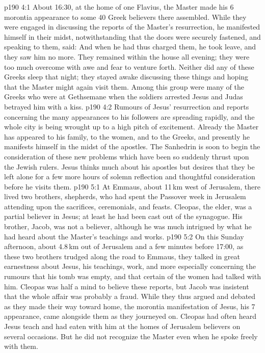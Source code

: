 \vs p190 4:1 About 16:30, at the home of one Flavius, the Master made his 6 morontia appearance to some 40 Greek believers there assembled. While they were engaged in discussing the reports of the Master’s resurrection, he manifested himself in their midst, notwithstanding that the doors were securely fastened, and speaking to them, said:  And when he had thus charged them, he took leave, and they saw him no more. They remained within the house all evening; they were too much overcome with awe and fear to venture forth. Neither did any of these Greeks sleep that night; they stayed awake discussing these things and hoping that the Master might again visit them. Among this group were many of the Greeks who were at Gethsemane when the soldiers arrested Jesus and Judas betrayed him with a kiss.
\vs p190 4:2 \pc Rumours of Jesus’ resurrection and reports concerning the many appearances to his followers are spreading rapidly, and the whole city is being wrought up to a high pitch of excitement. Already the Master has appeared to his family, to the women, and to the Greeks, and presently he manifests himself in the midst of the apostles. The Sanhedrin is soon to begin the consideration of these new problems which have been so suddenly thrust upon the Jewish rulers. Jesus thinks much about his apostles but desires that they be left alone for a few more hours of solemn reflection and thoughtful consideration before he visits them.
\vs p190 5:1 At Emmaus, about 11\,km west of Jerusalem, there lived two brothers, shepherds, who had spent the Passover week in Jerusalem attending upon the sacrifices, ceremonials, and feasts. Cleopas, the elder, was a partial believer in Jesus; at least he had been cast out of the synagogue. His brother, Jacob, was not a believer, although he was much intrigued by what he had heard about the Master’s teachings and works.
\vs p190 5:2 On this Sunday afternoon, about 4.8\,km out of Jerusalem and a few minutes before 17:00, as these two brothers trudged along the road to Emmaus, they talked in great earnestness about Jesus, his teachings, work, and more especially concerning the rumours that his tomb was empty, and that certain of the women had talked with him. Cleopas was half a mind to believe these reports, but Jacob was insistent that the whole affair was probably a fraud. While they thus argued and debated as they made their way toward home, the morontia manifestation of Jesus, his 7 appearance, came alongside them as they journeyed on. Cleopas had often heard Jesus teach and had eaten with him at the homes of Jerusalem believers on several occasions. But he did not recognize the Master even when he spoke freely with them.
